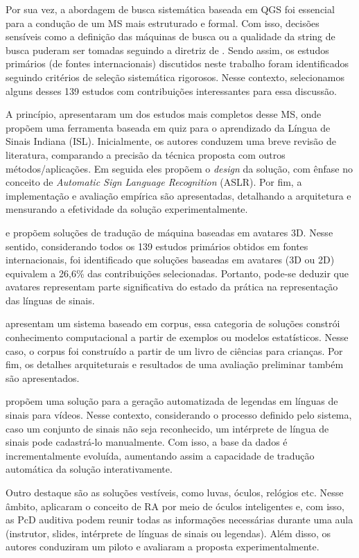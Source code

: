 Por sua vez, a abordagem de busca sistemática baseada em QGS foi essencial para a condução de um MS mais estruturado e formal. Com isso, decisões sensíveis como a definição das máquinas de busca ou a qualidade da string de busca puderam ser tomadas seguindo a diretriz de . Sendo assim, os estudos primários (de fontes internacionais) discutidos neste trabalho foram identificados seguindo critérios de seleção sistemática rigorosos. Nesse contexto, selecionamos alguns desses 139 estudos com contribuições interessantes para essa discussão.

A  princípio,  apresentaram um dos estudos mais completos desse MS, onde propõem uma ferramenta baseada em quiz para o aprendizado da Língua de Sinais Indiana (ISL). Inicialmente, os autores conduzem uma breve revisão de literatura, comparando a precisão da técnica proposta com outros métodos/aplicações. Em seguida eles propõem o \textit{design} da solução, com ênfase no conceito de \textit{Automatic Sign Language Recognition} (ASLR). Por fim, a implementação e avaliação empírica são apresentadas, detalhando a arquitetura e mensurando a efetividade da solução experimentalmente.

 e  propõem soluções de tradução de máquina baseadas em avatares 3D. Nesse sentido, considerando todos os 139 estudos primários obtidos em fontes internacionais, foi identificado que soluções baseadas em avatares (3D ou 2D) equivalem a 26,6\% das contribuições selecionadas. Portanto, pode-se deduzir que avatares representam parte significativa do estado da prática na representação das línguas de sinais.

 apresentam um sistema baseado em corpus, essa categoria de soluções constrói conhecimento computacional a partir de exemplos ou modelos estatísticos. Nesse caso, o corpus foi construído a partir de um livro de ciências para crianças. Por fim, os detalhes arquiteturais e resultados de uma avaliação preliminar também são apresentados.

 propõem uma solução para a geração automatizada de legendas em línguas de sinais para vídeos. Nesse contexto, considerando o processo definido pelo sistema, caso um conjunto de sinais não seja reconhecido, um intérprete de língua de sinais pode cadastrá-lo manualmente. Com isso, a base da dados é incrementalmente evoluída, aumentando assim a capacidade de tradução automática da solução interativamente.

Outro destaque são as soluções vestíveis, como luvas, óculos, relógios etc. Nesse âmbito,  aplicaram o conceito de RA por meio de óculos inteligentes e, com isso, as PcD auditiva podem reunir todas as informações necessárias durante uma aula (instrutor, slides, intérprete de línguas de sinais ou legendas). Além disso, os autores conduziram um piloto e avaliaram a proposta experimentalmente.

